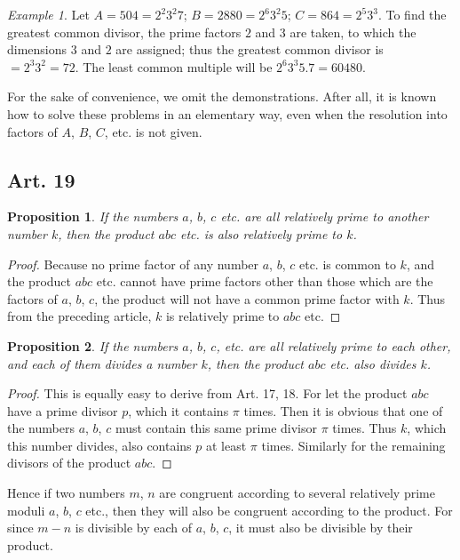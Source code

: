 \documentclass{book}
\theoremstyle{plain}
\newtheorem{proposition}{Proposition}
\theoremstyle{remark}
\newtheorem*{example}{Example}
\begin{document}
\begin{example} Let $A = 504 = 2^2 3^2 7$; $B = 2880 = 2^6 3^2 5$; $C = 864 = 2^5 3^3$.  To find the greatest common divisor, the prime factors $2$ and $3$ are taken, to which the dimensions $3$ and $2$ are assigned; thus the greatest common divisor is $= 2^3 3^2 = 72$.  The least common multiple will be $2^6 3^3 5.7 = 60480$. \end{example}

For the sake of convenience, we omit the demonstrations.   After all, it is known how to solve these problems in an elementary way, even when the resolution into factors of $A$, $B$, $C$, etc. is not given. 

\subsection*{Art. 19}

\begin{proposition} If the numbers $a$, $b$, $c$ etc. are all relatively prime to another number $k$, then the product $abc$ etc. is also relatively prime to $k$. \end{proposition}
\begin{proof} Because no prime factor of any number $a$, $b$, $c$ etc. is common to $k$, and the product $abc$ etc. cannot have prime factors other than those which are the factors of $a$, $b$, $c$, the product will not have a common prime factor with $k$.  Thus from the preceding article, $k$ is relatively prime to $abc$ etc. \end{proof}

\begin{proposition} If the numbers $a$, $b$, $c$, etc. are all relatively prime to each other, and each of them divides a number $k$, then the product $abc$ etc. also divides $k$. \end{proposition}
\begin{proof} This is equally easy to derive from Art. 17, 18.  For let the product $abc$ have a prime divisor $p$, which it contains $\pi$ times.  Then it is obvious that one of the numbers $a$, $b$, $c$ must contain this same prime divisor $\pi$ times.  Thus $k$, which this number divides, also contains $p$ at least $\pi$ times.  Similarly for the remaining divisors of the product $abc$. \end{proof}

Hence if two numbers $m$, $n$ are congruent according to several relatively prime moduli $a$, $b$, $c$ etc., then they will also be congruent according to the product.   For since $m-n$ is divisible by each of $a$, $b$, $c$, it must also be divisible by their product.
\end{document}
